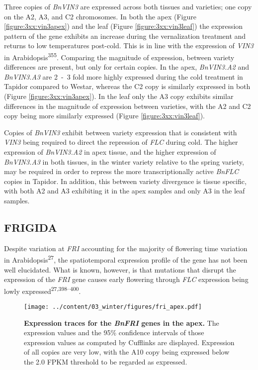 \documentclass[12pt,]{book}
\begin{document}
Three copies of \emph{BnVIN3} are expressed across both tissues and
varieties; one copy on the A2, A3, and C2 chromosomes. In both the apex
(Figure \ref{figure:3xx:vin3apex}) and the leaf (Figure
\ref{figure:3xx:vin3leaf}) the expression pattern of the gene exhibits
an increase during the vernalization treatment and returns to low
temperatures post-cold. This is in line with the expression of
\emph{VIN3} in Arabidopsis\textsuperscript{355}. Comparing the magnitude
of expression, between variety differences are present, but only for
certain copies. In the apex, \emph{BnVIN3.A2} and \emph{BnVIN3.A3} are
2~-~3 fold more highly expressed during the cold treatment in Tapidor
compared to Westar, whereas the C2 copy is similarly expressed in both
(Figure \ref{figure:3xx:vin3apex}). In the leaf only the A3 copy
exhibits similar differences in the magnitude of expression between
varieties, with the A2 and C2 copy being more similarly expressed
(Figure \ref{figure:3xx:vin3leaf}).

Copies of \emph{BnVIN3} exhibit between variety expression that is
consistent with \emph{VIN3} being required to direct the repression of
\emph{FLC} during cold. The higher expression of \emph{BnVIN3.A2} in
apex tissue, and the higher expression of \emph{BnVIN3.A3} in both
tissues, in the winter variety relative to the spring variety, may be
required in order to repress the more transcriptionally active
\emph{BnFLC} copies in Tapidor. In addition, this between variety
divergence is tissue specific, with both A2 and A3 exhibiting it in the
apex samples and only A3 in the leaf samples.

\subsection{FRIGIDA}\label{section:winter:fri}

Despite variation at \emph{FRI} accounting for the majority of flowering
time variation in Arabidopsis\textsuperscript{27}, the spatiotemporal
expression profile of the gene has not been well elucidated. What is
known, however, is that mutations that disrupt the expression of the
\emph{FRI} gene causes early flowering through \emph{FLC} expression
being lowly expressed\textsuperscript{27,398--400}.

\begin{figure}[htbp]
\centering
\texttt{[image: ../content/03\_winter/figures/fri\_apex.pdf]}
\caption{\textbf{Expression traces for the \emph{BnFRI} genes in the
apex.} The expression values and the 95\% confidence intervals of those
expression values as computed by Cufflinks are displayed. Expression of
all copies are very low, with the A10 copy being expressed below the 2.0
FPKM threshold to be regarded as expressed.}\label{figure:3xx:friapex}
\end{figure}
\end{document}
